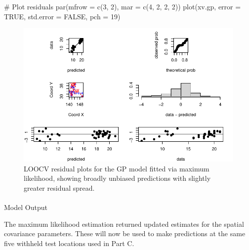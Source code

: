 \documentclass[
  11pt,
]{article}
\makeatletter
\let\oldparagraph\paragraph
\renewcommand{\paragraph}{
    \@ifstar
      \xxxParagraphStar
      \xxxParagraphNoStar
  }
\newcommand{\xxxParagraphStar}[1]{\oldparagraph*{#1}\mbox{}}
\newcommand{\xxxParagraphNoStar}[1]{\oldparagraph{#1}\mbox{}}
\newenvironment{Shaded}{\begin{snugshade}}{\end{snugshade}}
\newcommand{\AttributeTok}[1]{\textcolor[rgb]{0.40,0.45,0.13}{#1}}
\newcommand{\CommentTok}[1]{\textcolor[rgb]{0.37,0.37,0.37}{#1}}
\newcommand{\ConstantTok}[1]{\textcolor[rgb]{0.56,0.35,0.01}{#1}}
\newcommand{\DecValTok}[1]{\textcolor[rgb]{0.68,0.00,0.00}{#1}}
\newcommand{\FunctionTok}[1]{\textcolor[rgb]{0.28,0.35,0.67}{#1}}
\newcommand{\NormalTok}[1]{\textcolor[rgb]{0.00,0.23,0.31}{#1}}
\makeatother
\begin{document}
\begin{Shaded}
\begin{Highlighting}[]
\CommentTok{\# Plot residuals}
\FunctionTok{par}\NormalTok{(}\AttributeTok{mfrow =} \FunctionTok{c}\NormalTok{(}\DecValTok{3}\NormalTok{, }\DecValTok{2}\NormalTok{), }\AttributeTok{mar =} \FunctionTok{c}\NormalTok{(}\DecValTok{4}\NormalTok{, }\DecValTok{2}\NormalTok{, }\DecValTok{2}\NormalTok{, }\DecValTok{2}\NormalTok{))}
\FunctionTok{plot}\NormalTok{(xv.gp, }\AttributeTok{error =} \ConstantTok{TRUE}\NormalTok{, }\AttributeTok{std.error =} \ConstantTok{FALSE}\NormalTok{, }\AttributeTok{pch =} \DecValTok{19}\NormalTok{)}
\end{Highlighting}
\end{Shaded}

\begin{figure}[H]

{\centering \includegraphics{project_files/figure-pdf/fig-cvgp-1.pdf}

}

\caption{LOOCV residual plots for the GP model fitted via maximum
likelihood, showing broadly unbiased predictions with slightly greater
residual spread.}

\end{figure}%

\paragraph{Model Output}\label{model-output}

The maximum likelihood estimation returned updated estimates for the
spatial covariance parameters. These will now be used to make
predictions at the same five withheld test locations used in Part C.
\end{document}

